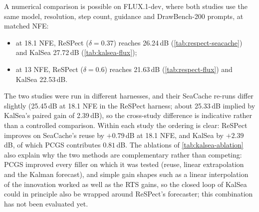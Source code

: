 A numerical comparison is possible on FLUX.1-dev, where both studies use the same model, resolution, step count, guidance and DrawBench-200 prompts, at matched NFE:
\begin{itemize}
  \item at 18.1 NFE, ReSPect ($\delta=0.37$) reaches 26.24\,dB (\cref{tab:respect-seacache}) and KalSea 27.72\,dB (\cref{tab:kalsea-flux});
  \item at 13 NFE, ReSPect ($\delta=0.6$) reaches 21.63\,dB (\cref{tab:respect-flux}) and KalSea 22.53\,dB.
\end{itemize}
The two studies were run in different harnesses, and their SeaCache re-runs differ slightly (25.45\,dB at 18.1 NFE in the ReSPect harness; about 25.33\,dB implied by KalSea's paired gain of 2.39\,dB), so the cross-study difference is indicative rather than a controlled comparison. Within each study the ordering is clear: ReSPect improves on SeaCache's reuse by $+0.79$\,dB at 18.1 NFE, and KalSea by $+2.39$\,dB, of which PCGS contributes $0.81$\,dB. The ablations of \cref{tab:kalsea-ablation} also explain why the two methods are complementary rather than competing: PCGS improved every filler on which it was tested (reuse, linear extrapolation and the Kalman forecast), and simple gain shapes such as a linear interpolation of the innovation worked as well as the RTS gains, so the closed loop of KalSea could in principle also be wrapped around ReSPect's forecaster; this combination has not been evaluated yet.
